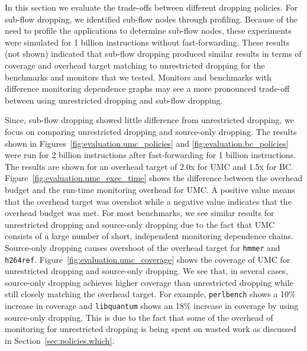 In this section we evaluate the trade-offs between different dropping policies.
For sub-flow dropping, we identified sub-flow nodes through profiling. Because
of the need to profile the applications to determine sub-flow nodes, these
experiments were simulated for 1 billion instructions without fast-forwarding.
These results (not shown) indicated that sub-flow dropping produced similar
results in terms of coverage and overhead target matching to unrestricted
dropping for the benchmarks and monitors that we tested. Monitors and
benchmarks with difference monitoring dependence graphs may see a more
pronounced trade-off between using unrestricted dropping and sub-flow dropping.

Since, sub-flow dropping showed little difference from unrestricted dropping,
we focus on comparing unrestricted dropping and source-only dropping. The
results shown in Figures~\ref{fig:evaluation.umc_policies} and
\ref{fig:evaluation.bc_policies} were run for 2 billion instructions after
fast-forwarding for 1 billion instructions.
The results are shown for an overhead target of 2.0x for UMC and 1.5x for BC.
Figure~\ref{fig:evaluation.umc_exec_time} shows the difference between the
overhead budget and the run-time monitoring overhead for UMC. A positive value
means that the overhead target was overshot while a negative value indicates
that the overhead budget was met. For most benchmarks, we see similar results for unrestricted
dropping and source-only dropping due to the fact that UMC consists of a large
number of short, independent monitoring dependence chains. Source-only dropping
causes overshoot of the overhead target for {\tt hmmer} and {\tt h264ref}.
Figure~\ref{fig:evaluation.umc_coverage} shows the coverage of UMC for
unrestricted dropping and source-only dropping. We see that, in several cases, source-only dropping
achieves higher coverage than unrestricted dropping while still closely matching the overhead target. For example, {\tt perlbench} shows a 10\% increase in coverage and {\tt libquantum} shows an 18\% increase in coverage by using source-only dropping. This is due
to the fact that some of the overhead of monitoring for unrestricted dropping
is being spent on wasted work as discussed in Section~\ref{sec:policies.which}.

